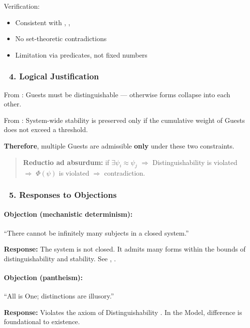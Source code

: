 \documentclass[12pt]{article}
\begin{document}
Verification:

\begin{itemize}
\item Consistent with \text{[5]}, \text{[11.1.1]}, \text{[18]}
\item No set-theoretic contradictions
\item Limitation via predicates, not fixed numbers
\end{itemize}

\subsubsection*{🔹 4. Logical Justification}

From \text{[5]}: Guests must be distinguishable — otherwise forms collapse into each other.

From \text{[18]}: System-wide stability is preserved only if the cumulative weight of Guests does not exceed a threshold.

\textbf{Therefore}, multiple Guests are admissible \textbf{only} under these two constraints.

\begin{quote}
\textbf{Reductio ad absurdum:} if $\exists\psi_i \approx \psi_j$ $\Rightarrow$ Distinguishability is violated $\Rightarrow$ $\Phi(\psi)$ is violated $\Rightarrow$ contradiction.
\end{quote}

\subsubsection*{🔹 5. Responses to Objections}

\paragraph{Objection (mechanistic determinism):}
``There cannot be infinitely many subjects in a closed system.''

\textbf{Response:} The system is not closed. It admits many forms within the bounds of distinguishability and stability. See \text{[4.3]}, \text{[11.1.1]}.

\bigskip

\paragraph{Objection (pantheism):}
``All is One; distinctions are illusory.''

\textbf{Response:} Violates the axiom of Distinguishability \text{[5]}. In the Model, difference is foundational to existence.
\end{document}

